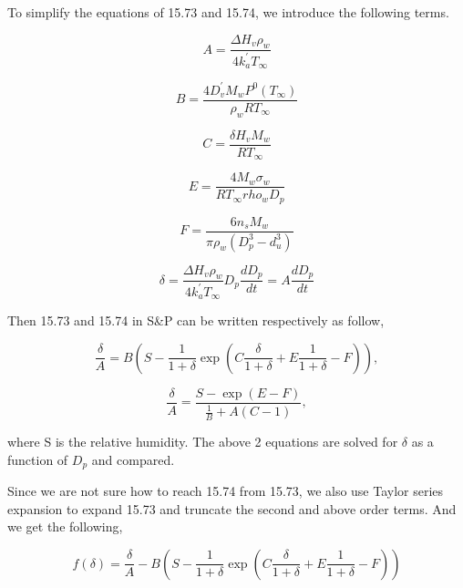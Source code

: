 \documentclass[12pt]{amsart}
\begin{document}
To simplify the equations of 15.73 and 15.74, we introduce the following terms.

\begin{equation}
A=\frac{\Delta H_{v} \rho_w}{4 k_a^{'} T_{\infty}}
\end{equation}

\begin{equation}
B=\frac{4 D_{v}^{'} M_{w} P^{0}(T_{\infty})}{\rho_w R T_{\infty}}
\end{equation}

\begin{equation}
C=\frac{\delta H_{v} M_{w}}{R T_{\infty}}
\end{equation}

\begin{equation}
E=\frac{4 M_{w}\sigma_{w}}{R T_{\infty} rho_{w} D_{p}}
\end{equation}

\begin{equation}
F=\frac{6 n_{s} M_{w}}{\pi \rho_{w} (D_{p}^{3}-d_{u}^{3})}
\end{equation}

\begin{equation}
\delta=\frac{\Delta H_{v} \rho_w}{4 k_a^{'} T_{\infty}} D_{p} \frac{d D_{p}}{dt}=A\frac{d D_{p}}{dt}
\end{equation}

Then 15.73 and 15.74 in S\&P can be written respectively as follow,

\begin{equation}
\frac{\delta}{A}=B(S-\frac{1}{1+\delta}\exp(C\frac{\delta}{1+\delta}+E \frac{1}{1+\delta}-F)),
\end{equation}

\begin{equation}
\frac{\delta}{A}=\frac{S-\exp(E-F)}{\frac{1}{B}+A(C-1)},
\end{equation}

where S is the relative humidity. The above 2 equations are solved for $\delta$ as a function of $D_{p}$ and compared. 


Since we are not sure how to reach 15.74 from 15.73, we also use Taylor series expansion to expand 15.73 and truncate the second and above order terms. And we get the following,

\begin{equation}
f(\delta)=\frac{\delta}{A}-B(S-\frac{1}{1+\delta}\exp(C\frac{\delta}{1+\delta}+E \frac{1}{1+\delta}-F))
\end{equation}
\end{document}

